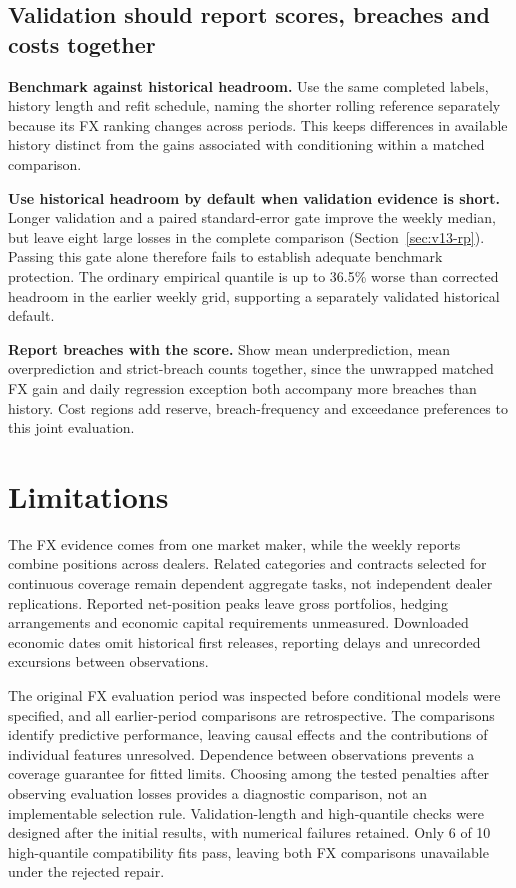 \documentclass[12pt,a4paper]{article}
\begin{document}
\subsection{Validation should report scores, breaches and costs together}


\textbf{Benchmark against historical headroom.} Use the same completed labels, history length and refit schedule, naming the shorter rolling reference separately because its FX ranking changes across periods. This keeps differences in available history distinct from the gains associated with conditioning within a matched comparison.

\textbf{Use historical headroom by default when validation evidence is short.} Longer validation and a paired standard-error gate improve the weekly median, but leave eight large losses in the complete comparison (Section~\ref{sec:v13-rp}). Passing this gate alone therefore fails to establish adequate benchmark protection. The ordinary empirical quantile is up to 36.5\% worse than corrected headroom in the earlier weekly grid, supporting a separately validated historical default.

\textbf{Report breaches with the score.} Show mean underprediction, mean overprediction and strict-breach counts together, since the unwrapped matched FX gain and daily regression exception both accompany more breaches than history. Cost regions add reserve, breach-frequency and exceedance preferences to this joint evaluation.

\FloatBarrier

\section{Limitations}\label{sec:limitations}

The FX evidence comes from one market maker, while the weekly reports combine positions across dealers. Related categories and contracts selected for continuous coverage remain dependent aggregate tasks, not independent dealer replications. Reported net-position peaks leave gross portfolios, hedging arrangements and economic capital requirements unmeasured. Downloaded economic dates omit historical first releases, reporting delays and unrecorded excursions between observations.

The original FX evaluation period was inspected before conditional models were specified, and all earlier-period comparisons are retrospective. The comparisons identify predictive performance, leaving causal effects and the contributions of individual features unresolved. Dependence between observations prevents a coverage guarantee for fitted limits. Choosing among the tested penalties after observing evaluation losses provides a diagnostic comparison, not an implementable selection rule. Validation-length and high-quantile checks were designed after the initial results, with numerical failures retained. Only 6 of 10 high-quantile compatibility fits pass, leaving both FX comparisons unavailable under the rejected repair.
\end{document}
